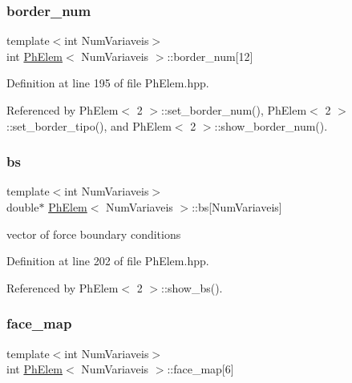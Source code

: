 \mbox{\label{classPhElem_ad153ce0aef191aac0f28f2addd213c71}} 
\subsubsection{\texorpdfstring{border\+\_\+num}{border\_num}}
{\footnotesize\ttfamily template$<$int Num\+Variaveis$>$ \\
int \hyperlink{classPhElem}{Ph\+Elem}$<$ Num\+Variaveis $>$\+::border\+\_\+num\mbox{[}12\mbox{]}\hspace{0.3cm}{\ttfamily [protected]}}



Definition at line 195 of file Ph\+Elem.\+hpp.



Referenced by Ph\+Elem$<$ 2 $>$\+::set\+\_\+border\+\_\+num(), Ph\+Elem$<$ 2 $>$\+::set\+\_\+border\+\_\+tipo(), and Ph\+Elem$<$ 2 $>$\+::show\+\_\+border\+\_\+num().

\mbox{\label{classPhElem_a42b747116ec9223cdebbc424e27f4089}} 
\subsubsection{\texorpdfstring{bs}{bs}}
{\footnotesize\ttfamily template$<$int Num\+Variaveis$>$ \\
double$\ast$ \hyperlink{classPhElem}{Ph\+Elem}$<$ Num\+Variaveis $>$\+::bs\mbox{[}Num\+Variaveis\mbox{]}\hspace{0.3cm}{\ttfamily [protected]}}



vector of force boundary conditions 



Definition at line 202 of file Ph\+Elem.\+hpp.



Referenced by Ph\+Elem$<$ 2 $>$\+::show\+\_\+bs().

\mbox{\label{classPhElem_a300b484c07390b9016d9ed97980d76b3}} 
\subsubsection{\texorpdfstring{face\+\_\+map}{face\_map}}
{\footnotesize\ttfamily template$<$int Num\+Variaveis$>$ \\
int \hyperlink{classPhElem}{Ph\+Elem}$<$ Num\+Variaveis $>$\+::face\+\_\+map\mbox{[}6\mbox{]}\hspace{0.3cm}{\ttfamily [protected]}}



